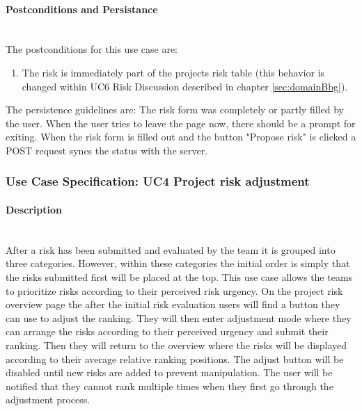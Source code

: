 \paragraph*{Postconditions and Persistance}\mbox{}\\
The postconditions for this use case are:
\begin{enumerate}
	\vspace{-3mm}
	\setlength\itemsep{-1em}
	\item The risk is immediately part of the projects risk table (this behavior is changed within UC6 Risk Discussion described in chapter \ref{sec:domainBbg}).
\end{enumerate}

\noindent
The persistence guidelines are: 
\newline
\noindent
The risk form was completely or partly filled by the user. When the user tries to leave the page now, there should be a prompt for exiting. When the risk form is filled out and the button "Propose risk" is clicked a POST request syncs the status with the server.

\newpage
\subsubsection{Use Case Specification: \ac{UC}4 Project risk adjustment}
\label{sec:domainBbe}

\paragraph*{Description}\mbox{}\\
After a risk has been submitted and evaluated by the team it is grouped into three categories. However, within these categories the initial order is simply that the risks submitted first will be placed at the top. This use case allows the teams to prioritize risks according to their perceived risk urgency. On the project risk overview page the after the initial risk evaluation users will find a button they can use to adjust the ranking. They will then enter adjustment mode where they can arrange the risks according to their perceived urgency and submit their ranking. Then they will return to the overview where the risks will be displayed according to their average relative ranking positions. The adjust button will be disabled until new risks are added to prevent manipulation. The user will be notified that they cannot rank multiple times when they first go through the adjustment process. 

